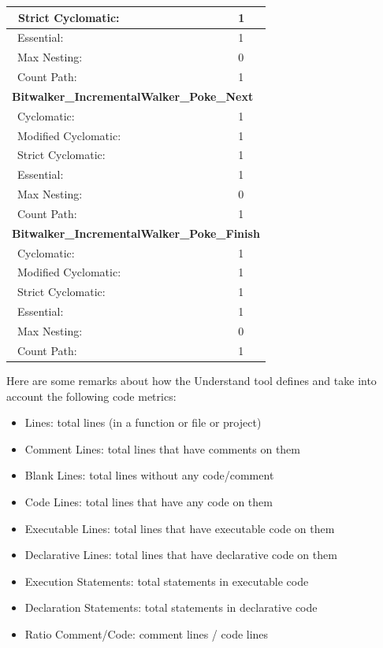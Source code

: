 \begin{longtable}{||p{}|p{}||}
\ Strict Cyclomatic: & 1 
\\\hline
\ Essential: & 1
 \\\hline
\ Max Nesting:   & 0
 \\\hline
\ Count Path: & 1
\\\hline
\multicolumn{2}{||l||}{\textbf{Bitwalker\_IncrementalWalker\_Poke\_Next}}
\\\hline
\ Cyclomatic: & 1
\\\hline
\ Modified Cyclomatic: & 1
\\\hline
\ Strict Cyclomatic: & 1 
\\\hline
\ Essential: & 1
 \\\hline
\ Max Nesting:   & 0
 \\\hline
\ Count Path: & 1
\\\hline
\multicolumn{2}{||l||}{\textbf{Bitwalker\_IncrementalWalker\_Poke\_Finish}}
\\\hline
\ Cyclomatic: & 1
\\\hline
\ Modified Cyclomatic: & 1
\\\hline
\ Strict Cyclomatic: & 1 
\\\hline
\ Essential: & 1
 \\\hline
\ Max Nesting:   & 0
 \\\hline
\ Count Path: & 1
\\\hline
\end{longtable}

Here are some remarks about how the Understand tool defines and take into account the following code metrics:
\begin{itemize}
\item Lines: total lines (in a function or file or project)
\item Comment Lines: total lines that have comments on them
\item Blank Lines: total lines without any code/comment
\item Code Lines: total lines that have any code on them
\item Executable Lines: total lines that have executable code on them
\item Declarative Lines: total lines that have declarative code on them
\item Execution Statements: total statements in executable code
\item Declaration Statements: total statements in declarative code
\item Ratio Comment/Code: comment lines / code lines
\end{itemize}

